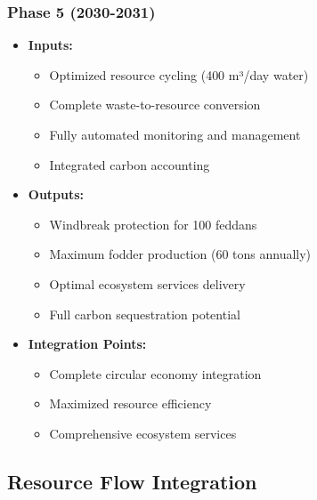 \subsubsection{Phase 5 (2030-2031)}
\begin{itemize}
    \item \textbf{Inputs:}
    \begin{itemize}
        \item Optimized resource cycling (400 m³/day water)
        \item Complete waste-to-resource conversion
        \item Fully automated monitoring and management
        \item Integrated carbon accounting
    \end{itemize}
    \item \textbf{Outputs:}
    \begin{itemize}
        \item Windbreak protection for 100 feddans
        \item Maximum fodder production (60 tons annually)
        \item Optimal ecosystem services delivery
        \item Full carbon sequestration potential
    \end{itemize}
    \item \textbf{Integration Points:}
    \begin{itemize}
        \item Complete circular economy integration
        \item Maximized resource efficiency
        \item Comprehensive ecosystem services
    \end{itemize}
\end{itemize}

\subsection{Resource Flow Integration}

